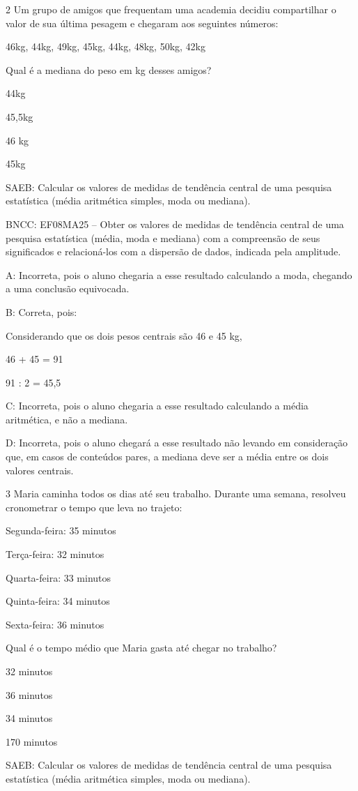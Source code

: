 {\num{2} Um grupo de amigos que frequentam uma academia decidiu compartilhar o
valor de sua última pesagem e chegaram aos seguintes números:

46kg, 44kg, 49kg, 45kg, 44kg, 48kg, 50kg, 42kg

Qual é a mediana do peso em kg desses amigos?
\item 44kg
\item 45,5kg
\item 46 kg
\item 45kg

SAEB: Calcular os valores de medidas de tendência central de uma
pesquisa estatística (média aritmética simples, moda ou mediana).

BNCC: EF08MA25 -- Obter os valores de medidas de tendência central de
uma pesquisa estatística (média, moda e mediana) com a compreensão de
seus significados e relacioná-los com a dispersão de dados, indicada
pela amplitude.

A: Incorreta, pois o aluno chegaria a esse resultado calculando a moda,
chegando a uma conclusão equivocada.

B: Correta, pois:

Considerando que os dois pesos centrais são 46 e 45 kg,

46 + 45 = 91

91 : 2 = 45,5

C: Incorreta, pois o aluno chegaria a esse resultado calculando a média
aritmética, e não a mediana.

D: Incorreta, pois o aluno chegará a esse resultado não levando em
consideração que, em casos de conteúdos pares, a mediana deve ser a
média entre os dois valores centrais.

\num{3} Maria caminha todos os dias até seu trabalho. Durante uma semana,
resolveu cronometrar o tempo que leva no trajeto:

Segunda-feira: 35 minutos

Terça-feira: 32 minutos

Quarta-feira: 33 minutos

Quinta-feira: 34 minutos

Sexta-feira: 36 minutos

Qual é o tempo médio que Maria gasta até chegar no trabalho?
\item 32 minutos
\item 36 minutos
\item 34 minutos
\item 170 minutos

SAEB: Calcular os valores de medidas de tendência central de uma
pesquisa estatística (média aritmética simples, moda ou mediana).

}
